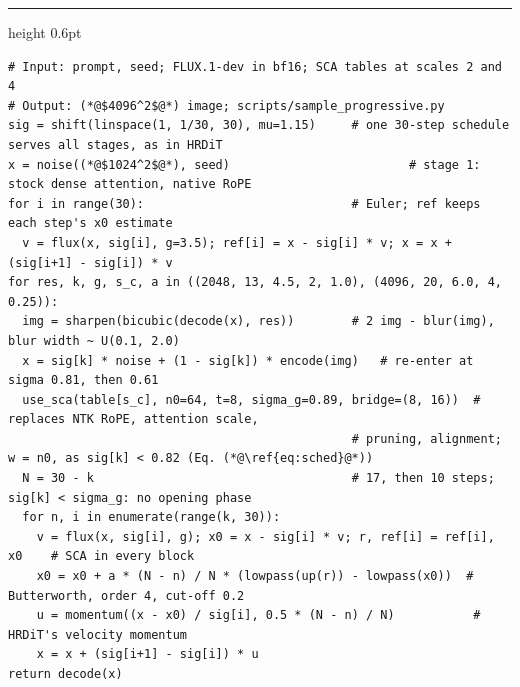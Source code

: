 \vspace{10pt}
\noindent\begin{minipage}{\linewidth}
    \hrule height 0.6pt\vspace{2pt}
    \label{alg:prog}
    \vspace{-4pt}
\begin{lstlisting}[style=scacode, emph={shift,linspace,noise,flux,decode,encode,bicubic,sharpen,lowpass,up,momentum,use_sca}]
# Input: prompt, seed; FLUX.1-dev in bf16; SCA tables at scales 2 and 4
# Output: (*@$4096^2$@*) image; scripts/sample_progressive.py
sig = shift(linspace(1, 1/30, 30), mu=1.15)     # one 30-step schedule serves all stages, as in HRDiT
x = noise((*@$1024^2$@*), seed)                         # stage 1: stock dense attention, native RoPE
for i in range(30):                             # Euler; ref keeps each step's x0 estimate
  v = flux(x, sig[i], g=3.5); ref[i] = x - sig[i] * v; x = x + (sig[i+1] - sig[i]) * v
for res, k, g, s_c, a in ((2048, 13, 4.5, 2, 1.0), (4096, 20, 6.0, 4, 0.25)):
  img = sharpen(bicubic(decode(x), res))        # 2 img - blur(img), blur width ~ U(0.1, 2.0)
  x = sig[k] * noise + (1 - sig[k]) * encode(img)   # re-enter at sigma 0.81, then 0.61
  use_sca(table[s_c], n0=64, t=8, sigma_g=0.89, bridge=(8, 16))  # replaces NTK RoPE, attention scale,
                                                # pruning, alignment; w = n0, as sig[k] < 0.82 (Eq. (*@\ref{eq:sched}@*))
  N = 30 - k                                    # 17, then 10 steps; sig[k] < sigma_g: no opening phase
  for n, i in enumerate(range(k, 30)):
    v = flux(x, sig[i], g); x0 = x - sig[i] * v; r, ref[i] = ref[i], x0    # SCA in every block
    x0 = x0 + a * (N - n) / N * (lowpass(up(r)) - lowpass(x0))  # Butterworth, order 4, cut-off 0.2
    u = momentum((x - x0) / sig[i], 0.5 * (N - n) / N)           # HRDiT's velocity momentum
    x = x + (sig[i+1] - sig[i]) * u
return decode(x)
\end{lstlisting}
\end{minipage}
